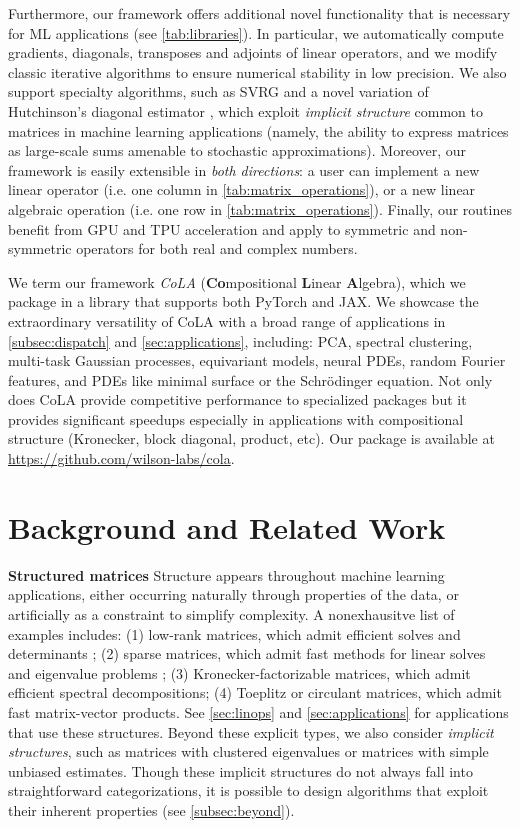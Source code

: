 \documentclass{article}
\begin{document}
Furthermore, our framework offers additional novel functionality that is necessary for ML applications (see \autoref{tab:libraries}).
In particular, we automatically compute gradients, diagonals, transposes and adjoints of linear operators,
and we modify classic iterative algorithms to ensure numerical stability in low precision.
We also support specialty algorithms, such as SVRG \citep{johnson2013accelerating} and a novel variation of Hutchinson's diagonal estimator \citep{hutchinson1989stochastic},
which exploit \emph{implicit structure} common to matrices in machine learning applications
(namely, the ability to express matrices as large-scale sums amenable to stochastic approximations).
Moreover, our framework is easily extensible in \emph{both directions}:
a user can implement a new linear operator (i.e. one column in \autoref{tab:matrix_operations}),
or a new linear algebraic operation (i.e. one row in \autoref{tab:matrix_operations}).
Finally, our routines benefit from GPU and TPU acceleration and apply to symmetric and non-symmetric operators for both real and complex numbers.

We term our framework \emph{CoLA} (\textbf{Co}mpositional \textbf{L}inear \textbf{A}lgebra), which we package in a library that supports both PyTorch and JAX.
We showcase the extraordinary versatility of CoLA with a broad range of applications in \autoref{subsec:dispatch} and \autoref{sec:applications}, including:
PCA, spectral clustering, multi-task Gaussian processes, equivariant models, neural PDEs, random Fourier features,
and PDEs like minimal surface or the Schr\"{o}dinger equation.
Not only does CoLA provide competitive performance to specialized packages but it provides significant speedups especially in applications with compositional structure (Kronecker, block diagonal, product, etc).
Our package is available at \url{https://github.com/wilson-labs/cola}.

\section{Background and Related Work} \label{sec:background}

\textbf{Structured matrices} \quad
Structure appears throughout machine learning applications,
either occurring naturally through properties of the data,
or artificially as a constraint to simplify complexity.
A nonexhausitve list of examples includes:
(1) low-rank matrices, which admit efficient solves and determinants \citep{woodbury1950inverting};
(2) sparse matrices, which admit fast methods for linear solves and eigenvalue problems \citep{davis2006direct,saad2003iterative};
(3) Kronecker-factorizable matrices,
which admit efficient spectral decompositions;
(4) Toeplitz or circulant matrices,
which admit fast matrix-vector products.
See \autoref{sec:linops} and \autoref{sec:applications} for applications that use these structures.
Beyond these explicit types,
we also consider \emph{implicit structures},
such as matrices with clustered eigenvalues or matrices with simple unbiased estimates.
Though these implicit structures do not always fall into straightforward categorizations,
it is possible to design algorithms that exploit their inherent properties (see \autoref{subsec:beyond}).
\end{document}
